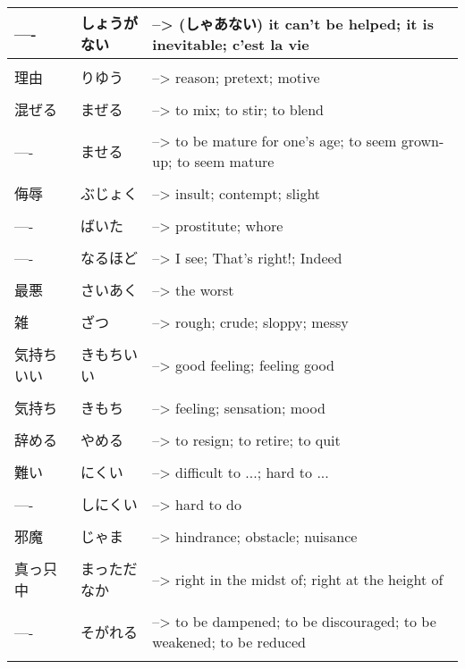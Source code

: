 \documentclass{article}
\begin{document}
\begin{tabular}{ l | l p{14cm} }
---- &しょうがない &--> (しゃあない) it can't be helped; it is inevitable; c'est la vie   \\ \hline\\[-1em]
理由 &りゆう &--> reason; pretext; motive   \\ \hline\\[-1em]
混ぜる &まぜる &--> to mix; to stir; to blend   \\ \hline\\[-1em]
---- &ませる &--> to be mature for one's age; to seem grown-up; to seem mature   \\ \hline\\[-1em]
侮辱 &ぶじょく &--> insult; contempt; slight   \\ \hline\\[-1em]
---- &ばいた &--> prostitute; whore   \\ \hline\\[-1em]
---- &なるほど &--> I see; That's right!; Indeed   \\ \hline\\[-1em]
最悪 &さいあく &--> the worst   \\ \hline\\[-1em]
雑 &ざつ &--> rough; crude; sloppy; messy   \\ \hline\\[-1em]
気持ちいい &きもちいい &--> good feeling; feeling good \\ \hline\\[-1em]
気持ち &きもち &--> feeling; sensation; mood \\ \hline\\[-1em]
辞める &やめる &--> to resign; to retire; to quit \\ \hline\\[-1em]
難い &にくい &--> difficult to ...; hard to ... \\ \hline\\[-1em]
---- &しにくい &--> hard to do \\ \hline\\[-1em]
邪魔 &じゃま &--> hindrance; obstacle; nuisance \\ \hline\\[-1em]
真っ只中 &まっただなか &--> right in the midst of; right at the height of \\ \hline\\[-1em]
---- &そがれる &--> to be dampened; to be discouraged; to be weakened; to be reduced   \\ \hline\\[-1em]
\end{tabular} \\
\end{document}
